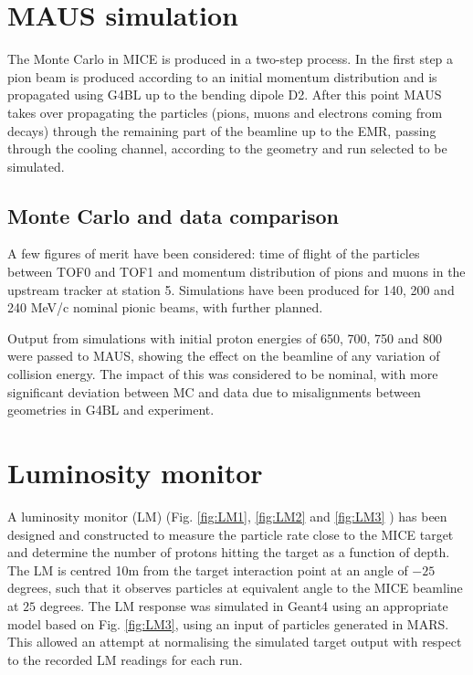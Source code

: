 \documentclass[a4paper,11pt]{article}
\begin{document}
\section{MAUS simulation}

The Monte Carlo in MICE is produced in a two-step process. In the first step a pion beam is produced according to an initial momentum distribution and is propagated using G4BL up to the bending dipole D2. After this point MAUS takes over propagating the particles (pions, muons and electrons coming from decays) through the remaining part of the beamline up to the EMR, passing through the cooling channel, according to the geometry and run selected to be simulated. 

\subsection{Monte Carlo and data comparison}

A few figures of merit have been considered: time of flight of the particles between TOF0 and TOF1 and momentum distribution of pions and muons in the upstream tracker at station 5.
Simulations have been produced for 140, 200 and 240 MeV/c nominal pionic beams, with further planned.  

Output from simulations with initial proton energies of 650, 700, 750 and 800 were passed to MAUS, showing the effect on the beamline of any variation of collision energy. The impact of this was considered to be nominal, with more significant deviation between MC and data due to misalignments between geometries in G4BL and  experiment.

\section{Luminosity monitor}

A luminosity monitor (LM) (Fig. \ref{fig:LM1}, \ref{fig:LM2} and \ref{fig:LM3} ) has been designed and constructed to measure the particle rate close to the MICE target and determine the number of protons hitting the target as a function of depth. The LM is centred 10m from the target interaction point at an angle of $-25$ degrees, such that it observes particles at equivalent angle to the MICE beamline at $25$ degrees. 
The LM response was simulated in Geant4 using an appropriate model based on Fig. \ref{fig:LM3}, using an input of particles generated in MARS. This allowed an attempt at normalising the simulated target output with respect to the recorded LM readings for each run.
\end{document}
